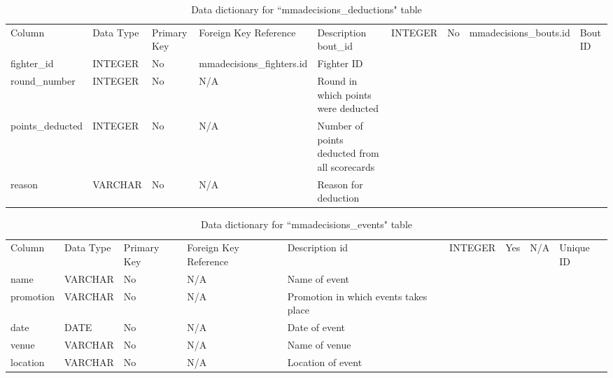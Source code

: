 \documentclass[12pt,twoside]{report}
\begin{document}
\tiny 
\begin{longtable}{lllll}
\caption{Data dictionary for ``mmadecisions\_deductions" table}\\ 
\toprule
Column           & Data Type & Primary Key & Foreign Key Reference     & Description                                    \endfirsthead 
\toprule
bout\_id         & INTEGER   & No          & mmadecisions\_bouts.id    & Bout ID                                        \\
fighter\_id      & INTEGER   & No          & mmadecisions\_fighters.id & Fighter ID                                     \\
round\_number    & INTEGER   & No          & N/A                       & Round in which points were deducted            \\
points\_deducted & INTEGER   & No          & N/A                       & Number of points deducted from all scorecards  \\
reason           & VARCHAR   & No          & N/A                       & Reason for deduction                           \\
\bottomrule
\end{longtable}
\normalsize

\tiny 
\begin{longtable}{lllll}
\caption{Data dictionary for ``mmadecisions\_events" table}\\ 
\toprule
Column    & Data Type & Primary Key & Foreign Key Reference & Description                            \endfirsthead 
\toprule
id        & INTEGER   & Yes         & N/A                   & Unique ID                              \\
name      & VARCHAR   & No          & N/A                   & Name of event                          \\
promotion & VARCHAR   & No          & N/A                   & Promotion in which events takes place  \\
date      & DATE      & No          & N/A                   & Date of event                          \\
venue     & VARCHAR   & No          & N/A                   & Name of venue                          \\
location  & VARCHAR   & No          & N/A                   & Location of event                      \\
\bottomrule
\end{longtable}
\normalsize
\end{document}
